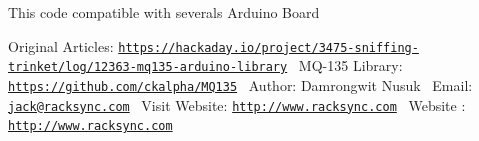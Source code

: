 This code compatible with severals Arduino Board

Original Articles\+: \href{https://hackaday.io/project/3475-sniffing-trinket/log/12363-mq135-arduino-library}{\tt https\+://hackaday.\+io/project/3475-\/sniffing-\/trinket/log/12363-\/mq135-\/arduino-\/library}~\newline
 M\+Q-\/135 Library\+: \href{https://github.com/ckalpha/MQ135}{\tt https\+://github.\+com/ckalpha/\+M\+Q135}~\newline
 Author\+: Damrongwit Nusuk~\newline
 Email\+: \href{mailto:jack@racksync.com}{\tt jack@racksync.\+com}~\newline
 Visit Website\+: \href{http://www.racksync.com}{\tt http\+://www.\+racksync.\+com}~\newline
 Website \+: \href{http://www.racksync.com}{\tt http\+://www.\+racksync.\+com}~\newline


 